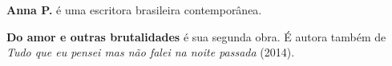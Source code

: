 
\textbf{Anna P.} é uma escritora brasileira contemporânea.

\textbf{Do amor e outras brutalidades} é sua segunda obra. 
É autora também de \textit{Tudo que eu pensei mas não falei na noite passada} (2014).

